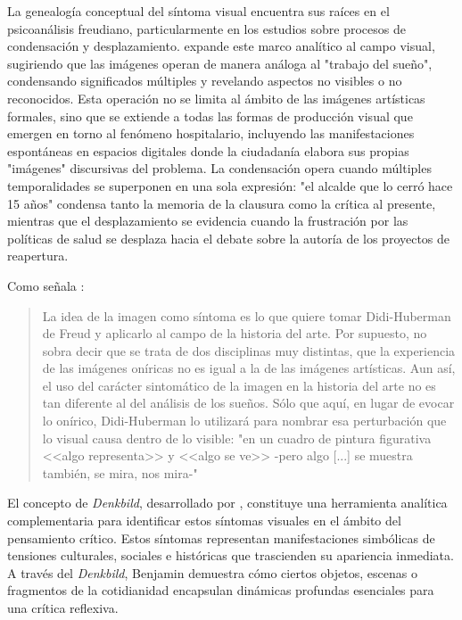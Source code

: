La genealogía conceptual del síntoma visual encuentra sus raíces en el psicoanálisis freudiano, particularmente en los estudios sobre procesos de condensación y desplazamiento. \parencite{DidiHuberman2011} expande este marco analítico al campo visual, sugiriendo que las imágenes operan de manera análoga al "trabajo del sueño", condensando significados múltiples y revelando aspectos no visibles o no reconocidos. Esta operación no se limita al ámbito de las imágenes artísticas formales, sino que se extiende a todas las formas de producción visual que emergen en torno al fenómeno hospitalario, incluyendo las manifestaciones espontáneas en espacios digitales donde la ciudadanía elabora sus propias "imágenes" discursivas del problema. La condensación opera cuando múltiples temporalidades se superponen en una sola expresión: "el alcalde que lo cerró hace 15 años" condensa tanto la memoria de la clausura como la crítica al presente, mientras que el desplazamiento se evidencia cuando la frustración por las políticas de salud se desplaza hacia el debate sobre la autoría de los proyectos de reapertura.

Como señala \parencite[p. 37]{VegaArevalo2017}:

\begin{quote}
    La idea de la imagen como síntoma es lo que quiere tomar Didi-Huberman de Freud y aplicarlo al campo de la historia del arte. Por supuesto, no sobra decir que se trata de dos disciplinas muy distintas, que la experiencia de las imágenes oníricas no es igual a la de las imágenes artísticas. Aun así, el uso del carácter sintomático de la imagen en la historia del arte no es tan diferente al del análisis de los sueños. Sólo que aquí, en lugar de evocar lo onírico, Didi-Huberman lo utilizará para nombrar esa perturbación que lo visual causa dentro de lo visible: "en un cuadro de pintura figurativa <<algo representa>> y <<algo se ve>> -pero algo [...] se muestra también, se mira, nos mira-"
\end{quote}

El concepto de \textit{Denkbild}, desarrollado por \parencite{Benjamin2004}, constituye una herramienta analítica complementaria para identificar estos síntomas visuales en el ámbito del pensamiento crítico. Estos síntomas representan manifestaciones simbólicas de tensiones culturales, sociales e históricas que trascienden su apariencia inmediata. A través del \textit{Denkbild}, Benjamin demuestra cómo ciertos objetos, escenas o fragmentos de la cotidianidad encapsulan dinámicas profundas esenciales para una crítica reflexiva.

